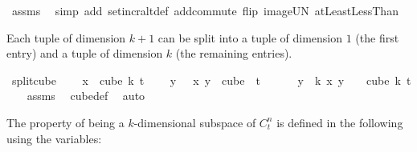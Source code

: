 \begin{isabellebody}
\ assms\ \isamarkupfalse%
\ {\isacharparenleft}{\kern0pt}simp\ add{\isacharcolon}{\kern0pt}\ set{\isacharunderscore}{\kern0pt}incr{\isacharunderscore}{\kern0pt}altdef\ add{\isachardot}{\kern0pt}commute\ flip{\isacharcolon}{\kern0pt}\ image{\isacharunderscore}{\kern0pt}UN\ atLeast{}LessThan{\isacharparenright}{\kern0pt}%
\endisatagproof
{\isafoldproof}%
%
\isadelimproof
%
\endisadelimproof
%
\begin{isamarkuptext}%
Each tuple of dimension $k+1$ can be split into a tuple of dimension $1$ (the first
entry) and a tuple of dimension $k$ (the remaining entries).%
\end{isamarkuptext}\isamarkuptrue%
\isamarkupfalse%
\ split{\isacharunderscore}{\kern0pt}cube{\isacharcolon}{\kern0pt}\ \isanewline
\ \ \ {\isachardoublequoteopen}x\ {\isasymin}\ cube\ {\isacharparenleft}{\kern0pt}k{\isacharplus}{\kern0pt}{}{\isacharparenright}{\kern0pt}\ t{\isachardoublequoteclose}\ \isanewline
\ \ \ {\isachardoublequoteopen}{\isacharparenleft}{\kern0pt}{\isasymlambda}y\ {\isasymin}\ {\isacharbraceleft}{\kern0pt}{\isachardot}{\kern0pt}{\isachardot}{\kern0pt}{\isacharless}{\kern0pt}{}{\isacharbraceright}{\kern0pt}{\isachardot}{\kern0pt}\ x\ y{\isacharparenright}{\kern0pt}\ {\isasymin}\ cube\ {}\ t{\isachardoublequoteclose}\ \isanewline
\ \ \ \ \ {\isachardoublequoteopen}{\isacharparenleft}{\kern0pt}{\isasymlambda}y\ {\isasymin}\ {\isacharbraceleft}{\kern0pt}{\isachardot}{\kern0pt}{\isachardot}{\kern0pt}{\isacharless}{\kern0pt}k{\isacharbraceright}{\kern0pt}{\isachardot}{\kern0pt}\ x\ {\isacharparenleft}{\kern0pt}y\ {\isacharplus}{\kern0pt}\ {}{\isacharparenright}{\kern0pt}{\isacharparenright}{\kern0pt}\ {\isasymin}\ cube\ k\ t{\isachardoublequoteclose}\isanewline
%
\isadelimproof
\ \ %
\endisadelimproof
%
\isatagproof
{}\isamarkupfalse%
\ assms\ \isamarkupfalse%
\ cube{\isacharunderscore}{\kern0pt}def\ \isamarkupfalse%
\ auto%
\endisatagproof
{\isafoldproof}%
%
\isadelimproof
%
\endisadelimproof
%
\isadelimdocument
%
\endisadelimdocument
%
\isatagdocument
%
\isamarkuptrue%
%
\endisatagdocument
{\isafolddocument}%
%
\isadelimdocument
%
\endisadelimdocument
%
\begin{isamarkuptext}%
The property of being a $k$-dimensional subspace of $C^n_t$ is defined in the following using the variables:


\end{isamarkuptext}
\end{isabellebody}
